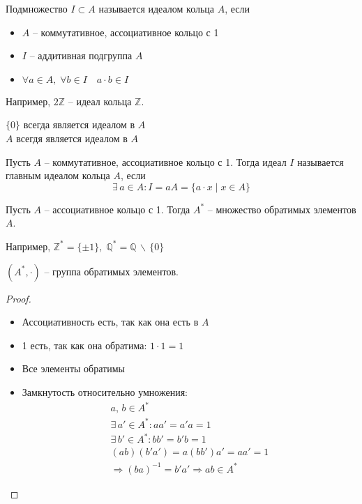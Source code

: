 \begin{conj}
    Подмножество $I \subset A$ называется идеалом кольца $A$, если 
    \begin{itemize}
        \item $A$ -- коммутативное, ассоциативное кольцо с 1 
        \item $I$ -- аддитивная подгруппа $A$ 
        \item $\forall a \in A,\; \forall b \in I \quad a \cdot b \in I$
    \end{itemize}
    Например, $2\mathbb{Z}$ -- идеал кольца  $\mathbb{Z}$.
\end{conj}
\begin{notice} 
  
    $\{ 0 \}$ всегда является идеалом в $A$ \\
    $A$ всегдя является идеалом в $A$
\end{notice}
\begin{conj}
    Пусть $A$ -- коммутативное, ассоциативное кольцо с 1. Тогда идеал $I$ называется главным идеалом кольца $A$, если 
    \[ \exists\, a \in A : I = aA = \{ a \cdot x \mid x \in A \} \] 
\end{conj}
\vspace{0.7cm}
  
\begin{conj}
    Пусть $A$ -- ассоциативное кольцо с 1. Тогда $A^*$ -- множество обратимых элементов $A$.
  
    Например, $\mathbb{Z}^* = \{ \pm1 \},\; \mathbb{Q}^* = \mathbb{Q}\, \backslash\, \{ 0 \}$
\end{conj}
\begin{theorem-non}
    $(A^*, \cdot)$ -- группа обратимых элементов.
\end{theorem-non}
\begin{proof} \quad
    \begin{itemize}
        \item Ассоциативность есть, так как она есть в $A$ 
        \item 1 есть, так как она обратима: $1 \cdot 1 = 1$
        \item Все элементы обратимы
        \item Замкнутость относительно умножения:
        \begin{gather*}
            a,\, b \in A^* \\
            \exists\, a' \in A^* : aa' = a'a = 1 \\
            \exists\, b' \in A^* : bb' = b'b = 1 \\
            (ab)(b'a') = a(bb')a' = aa' = 1 \\
            \Rightarrow (ba)^{-1} = b'a' \Rightarrow ab \in A^*   
        \end{gather*}
    \end{itemize}
\end{proof}